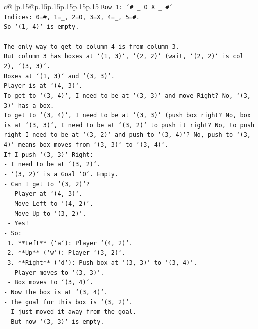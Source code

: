 \documentclass{article}
\begin{document}
{\begin{supertabular}{c@{$\;$}|p{.15\linewidth}@{}p{.15\linewidth}p{.15\linewidth}p{.15\linewidth}p{.15\linewidth}p{.15\linewidth}}
{{{\texttt{Row 1: `\# \_ O X \_ \#`} \\
\texttt{Indices: 0=\#, 1=\_, 2=O, 3=X, 4=\_, 5=\#.} \\
\texttt{So `(1, 4)` is empty.} \\
\\ 
\texttt{The only way to get to column 4 is from column 3.} \\
\texttt{But column 3 has boxes at `(1, 3)`, `(2, 2)` (wait, `(2, 2)` is col 2), `(3, 3)`.} \\
\texttt{Boxes at `(1, 3)` and `(3, 3)`.} \\
\texttt{Player is at `(4, 3)`.} \\
\texttt{To get to `(3, 4)`, I need to be at `(3, 3)` and move Right? No, `(3, 3)` has a box.} \\
\texttt{To get to `(3, 4)`, I need to be at `(3, 3)` (push box right? No, box is at `(3, 3)`, I need to be at `(3, 2)` to push it right? No, to push right I need to be at `(3, 2)` and push to `(3, 4)`? No, push to `(3, 4)` means box moves from `(3, 3)` to `(3, 4)`.} \\
\texttt{If I push `(3, 3)` Right:} \\
\texttt{{-} I need to be at `(3, 2)`.} \\
\texttt{{-} `(3, 2)` is a Goal `O`. Empty.} \\
\texttt{{-} Can I get to `(3, 2)`?} \\
\texttt{  {-} Player at `(4, 3)`.} \\
\texttt{  {-} Move Left to `(4, 2)`.} \\
\texttt{  {-} Move Up to `(3, 2)`.} \\
\texttt{  {-} Yes!} \\
\texttt{{-} So:} \\
\texttt{  1. **Left** (`a`): Player `(4, 2)`.} \\
\texttt{  2. **Up** (`w`): Player `(3, 2)`.} \\
\texttt{  3. **Right** (`d`): Push box at `(3, 3)` to `(3, 4)`.} \\
\texttt{     {-} Player moves to `(3, 3)`.} \\
\texttt{     {-} Box moves to `(3, 4)`.} \\
\texttt{{-} Now the box is at `(3, 4)`.} \\
\texttt{{-} The goal for this box is `(3, 2)`.} \\
\texttt{{-} I just moved it away from the goal.} \\
\texttt{{-} But now `(3, 3)` is empty.} \\
}}}
\end{supertabular}}
\end{document}

